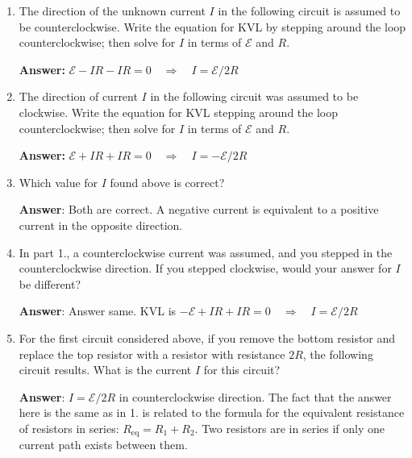 \documentclass{article}
\begin{document}
\begin{enumerate}

  \item The direction of the unknown current $I$ in the following circuit is assumed to be counterclockwise. Write the equation for KVL by stepping around the loop counterclockwise; then solve for $I$ in terms of $\mathcal{E}$ and $R$.

        

        \ifsolutions
        \textbf{Answer:} $\mathcal{E}-IR-IR=0 \quad \Rightarrow \quad I=\mathcal{E}/2R$
        \fi

  \item The direction of current $I$ in the following circuit was assumed to be clockwise. Write the equation for KVL stepping around the loop counterclockwise; then solve for $I$ in terms of $\mathcal{E}$ and $R$.

        

        \ifsolutions
        \textbf{Answer:} $\mathcal{E}+IR+IR=0 \quad \Rightarrow \quad I=-\mathcal{E}/2R$
        \fi

  \item Which value for $I$ found above is correct?

        \ifsolutions
        \textbf{Answer}: Both are correct. A negative current is equivalent to a positive current in the opposite direction.
        \else
        \vskip 36pt
        \fi

  \item In part 1., a counterclockwise current was assumed, and you stepped in the counterclockwise direction. If you stepped clockwise, would your answer for $I$ be different?

        \ifsolutions
        \textbf{Answer}: Answer same. KVL is $-\mathcal{E}+IR+IR=0 \quad \Rightarrow \quad I=\mathcal{E}/2R$
        \else
        \vskip 36pt
        \fi

  \item For the first circuit considered above, if you remove the bottom resistor and replace the top resistor with a resistor with resistance $2R$, the following circuit results. What is the current $I$ for this circuit?

        

        \ifsolutions
        \textbf{Answer}: $I=\mathcal{E}/2R$ in counterclockwise direction. The fact that the answer here is the same as in 1. is related to the formula for the equivalent resistance of resistors in series: $R_{\text{eq}}=R_1+R_2$. Two resistors are in series if only one current path exists between them.
        \fi

\end{enumerate}
\end{document}

